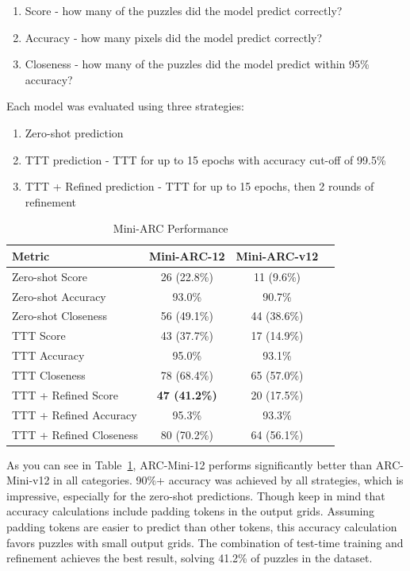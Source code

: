 \documentclass[10pt,twocolumn]{article}
\begin{document}
\begin{enumerate}
  \item Score - how many of the puzzles did the model
    predict correctly?
  \item Accuracy - how many pixels did the model predict correctly?
  \item Closeness - how many of the puzzles did the model predict
    within 95\% accuracy?
\end{enumerate}

Each model was evaluated using three strategies:
\begin{enumerate}
  \item Zero-shot prediction
  \item TTT prediction - TTT for up to 15 epochs with accuracy cut-off of 99.5\%
  \item TTT + Refined prediction - TTT for up to 15 epochs, then 2
    rounds of refinement
\end{enumerate}

\begin{table}
  \centering
  \caption{Mini-ARC Performance}
  \begin{tabular}{lccc}
    \toprule
    \textbf{Metric} & \textbf{Mini-ARC-12} &
    \textbf{Mini-ARC-v12} \\
    \midrule
    Zero-shot Score & 26 (22.8\%) & 11 (9.6\%)  \\
    Zero-shot Accuracy & 93.0\% & 90.7\%  \\
    Zero-shot Closeness & 56 (49.1\%) & 44 (38.6\%)  \\
    \addlinespace
    \cmidrule{1-3}
    TTT Score & 43 (37.7\%) & 17 (14.9\%)  \\
    TTT Accuracy & 95.0\% & 93.1\%  \\
    TTT Closeness & 78 (68.4\%) & 65 (57.0\%) \\
    \addlinespace
    \cmidrule{1-3}
    TTT + Refined Score  & \textbf{47 (41.2\%)} & 20 (17.5\%)  \\
    TTT + Refined Accuracy  & 95.3\% & 93.3\%  \\
    TTT + Refined Closeness  & 80 (70.2\%) & 64 (56.1\%)  \\
    \bottomrule
  \end{tabular}
  \label{tab:performance}
\end{table}

As you can see in Table~\ref{tab:performance}, ARC-Mini-12 performs
significantly better than ARC-Mini-v12 in all
categories. 90\%+ accuracy was achieved by all strategies, which is
impressive, especially for the zero-shot predictions. Though keep in
mind that accuracy calculations include padding tokens in the output
grids. Assuming padding tokens are easier to predict than other
tokens, this accuracy calculation favors puzzles with small output
grids. The combination of test-time training and refinement achieves
the best result, solving 41.2\% of puzzles in the dataset.
\end{document}
